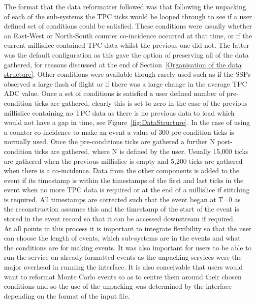 The format that the data reformatter followed was that following the unpacking of each of the sub-systems the TPC ticks would be looped through to see if a user defined set of conditions could be satisfied. These conditions were usually whether an East-West or North-South counter co-incidence occurred at that time, or if the current millislice contained TPC data whilst the previous one did not. The latter was the default configuration as this gave the option of preserving all of the data gathered, for reasons discussed at the end of Section~\ref{Organisation of the data structure}. Other conditions were available though rarely used such as if the SSPs observed a large flash of flight or if there was a large change in the average TPC ADC value. Once a set of conditions is satisfied a user defined number of pre-condition ticks are gathered, clearly this is set to zero in the case of the previous millislice containing no TPC data as there is no previous data to load which would not have a gap in time, see Figure~\ref{fig:DataStructure}. In the case of using a counter co-incidence to make an event a value of 300 pre-condition ticks is normally used. Once the pre-conditions ticks are gathered a further N post-condition ticks are gathered, where N is defined by the user. Usually 15,000 ticks are gathered when the previous millislice is empty and 5,200 ticks are gathered when there is a co-incidence. Data from the other components is added to the event if its timestamp is within the timestamps of the first and last ticks in the event when no more TPC data is required or at the end of a millislice if stitching is required. All timestamps are corrected such that the event began at T=0 as the reconstruction assumes this and the timestamp of the start of the event is stored in the event record so that it can be accessed downstream if required. \\

At all points in this process it is important to integrate flexibility so that the user can choose the length of events, which sub-systems are in the events and what the conditions are for making events. It was also important for users to be able to run the service on already formatted events as the unpacking services were the major overhead in running the interface. It is also conceivable that users would want to reformat Monte Carlo events so as to centre them around their chosen conditions and so the use of the unpacking was determined by the interface depending on the format of the input file.

